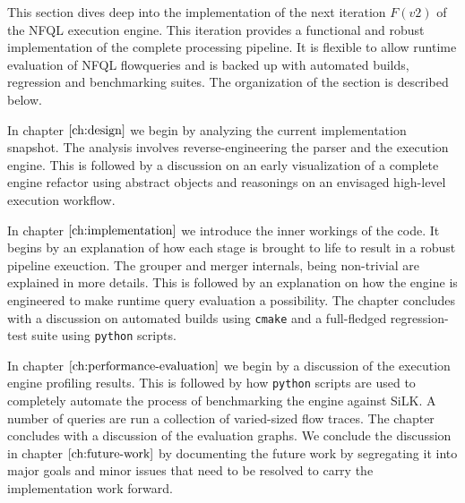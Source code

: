 
This section dives deep into the implementation of the next iteration $F(v2)$
of the \ac{NFQL} execution engine. This iteration provides a functional and
robust implementation of the complete processing pipeline. It is flexible to
allow runtime evaluation of \ac{NFQL} flowqueries and is backed up with
automated builds, regression and benchmarking suites. The organization of the
section is described below.

\vspace{50pt}

In chapter $\ref{ch:design}$ we begin by analyzing the current implementation
snapshot. The analysis involves reverse-engineering the parser and the
execution engine. This is followed by a discussion on an early visualization
of a complete engine refactor using abstract objects and reasonings on an
envisaged high-level execution workflow.

In chapter $\ref{ch:implementation}$ we introduce the inner workings of the
code. It begins by an explanation of how each stage is brought to life to
result in a robust pipeline exeuction. The grouper and merger internals, being
non-trivial are explained in more details. This is followed by an explanation
on how the engine is engineered to make runtime query evaluation a
possibility. The chapter concludes with a discussion on automated builds using
\texttt{cmake} and a full-fledged regression-test suite using \texttt{python}
scripts.

In chapter $\ref{ch:performance-evaluation}$ we begin by a discussion of the
execution engine profiling results. This is followed by how \texttt{python}
scripts are used to completely automate the process of benchmarking the engine
against SiLK. A number of queries are run a collection of varied-sized flow
traces. The chapter concludes with a discussion of the evaluation graphs. We
conclude the discussion in chapter $\ref{ch:future-work}$ by documenting the
future work by segregating it into major goals and minor issues that need to
be resolved to carry the implementation work forward.
